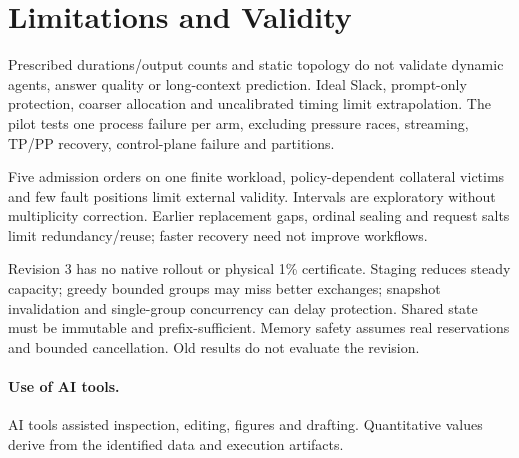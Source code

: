 \section{Limitations and Validity}
Prescribed durations/output counts and static topology do not validate dynamic
agents, answer quality or long-context prediction. Ideal Slack, prompt-only
protection, coarser allocation and uncalibrated timing limit extrapolation.
The pilot tests one process failure per arm, excluding pressure races,
streaming, TP/PP recovery, control-plane failure and partitions.

Five admission orders on one finite workload, policy-dependent collateral
victims and few fault positions limit external validity. Intervals are
exploratory without multiplicity correction. Earlier replacement gaps, ordinal
sealing and request salts limit redundancy/reuse; faster recovery need not
improve workflows.

Revision 3 has no native rollout or physical 1\% certificate. Staging reduces
steady capacity; greedy bounded groups may miss better exchanges; snapshot
invalidation and single-group concurrency can delay protection. Shared state
must be immutable and prefix-sufficient. Memory safety assumes real reservations
and bounded cancellation. Old results do not evaluate the revision.

\paragraph{Use of AI tools.}
AI tools assisted inspection, editing, figures and drafting. Quantitative
values derive from the identified data and execution artifacts.

